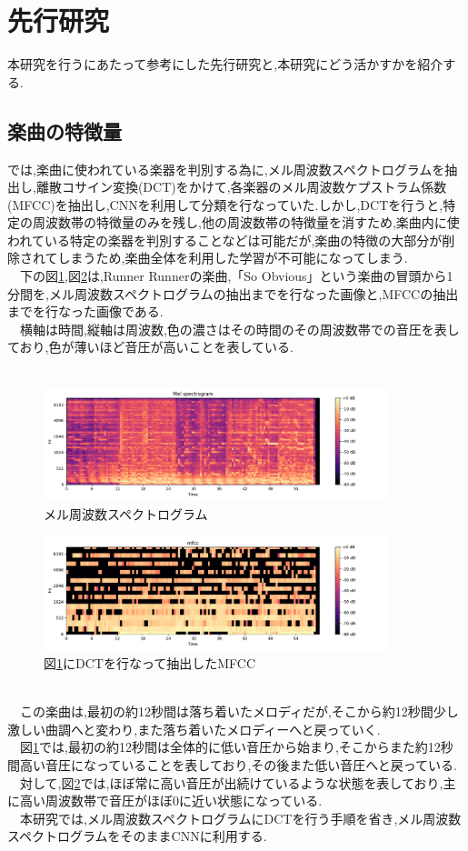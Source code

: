 \documentclass[twocolumn,twoside,9.5pt]{jarticle}
\begin{document}
\section{先行研究}
本研究を行うにあたって参考にした先行研究と,本研究にどう活かすかを紹介する.
\subsection{楽曲の特徴量}
\cite{deep}では,楽曲に使われている楽器を判別する為に,メル周波数スペクトログラムを抽出し,離散コサイン変換(DCT)をかけて,各楽器のメル周波数ケプストラム係数(MFCC)を抽出し,CNNを利用して分類を行なっていた.しかし,DCTを行うと,特定の周波数帯の特徴量のみを残し,他の周波数帯の特徴量を消すため,楽曲内に使われている特定の楽器を判別することなどは可能だが,楽曲の特徴の大部分が削除されてしまうため,楽曲全体を利用した学習が不可能になってしまう.\\
　下の図\ref{f1},図\ref{f2}は,Runner Runnerの楽曲,「So Obvious」という楽曲の冒頭から1分間を,メル周波数スペクトログラムの抽出までを行なった画像と,MFCCの抽出までを行なった画像である.\\
　横軸は時間,縦軸は周波数,色の濃さはその時間のその周波数帯での音圧を表しており,色が薄いほど音圧が高いことを表している.\\\
\begin{figure}[htbp]
	\includegraphics[width=100mm]{pic/melsample.pdf}
	\caption{メル周波数スペクトログラム}
	\label{f1}
\end{figure}
\begin{figure}[htbp]
	\includegraphics[width=100mm]{pic/mfccsample.pdf}
	\caption{図\ref{f1}にDCTを行なって抽出したMFCC}
	\label{f2}
\end{figure}
\\
　この楽曲は,最初の約12秒間は落ち着いたメロディだが,そこから約12秒間少し激しい曲調へと変わり,また落ち着いたメロディーへと戻っていく.\\
　図\ref{f1}では,最初の約12秒間は全体的に低い音圧から始まり,そこからまた約12秒間高い音圧になっていることを表しており,その後また低い音圧へと戻っている.\\
　対して,図\ref{f2}では,ほぼ常に高い音圧が出続けているような状態を表しており,主に高い周波数帯で音圧がほぼ0に近い状態になっている.\\
　本研究では,メル周波数スペクトログラムにDCTを行う手順を省き,メル周波数スペクトログラムをそのままCNNに利用する.
\end{document}
